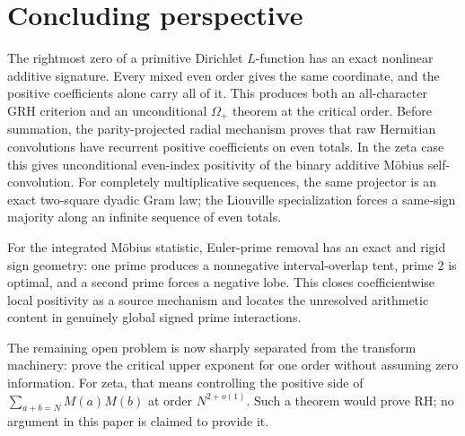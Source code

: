 \documentclass[11pt]{article}
\theoremstyle{remark}
\newcommand{\GRH}{\mathrm{GRH}}
\newcommand{\RH}{\mathrm{RH}}
\begin{document}
\section{Concluding perspective}

The rightmost zero of a primitive Dirichlet $L$-function has an exact nonlinear additive
signature.  Every mixed even order gives the same coordinate, and the positive coefficients
alone carry all of it.  This produces both an all-character $\GRH$ criterion and an unconditional
$\Omega_+$ theorem at the critical order.  Before summation, the parity-projected radial mechanism
proves that raw Hermitian convolutions have recurrent positive coefficients on even totals.  In
the zeta case this gives unconditional even-index positivity of the binary additive M\"obius
self-convolution.  For completely multiplicative sequences, the same projector is an exact
two-square dyadic Gram law; the Liouville specialization forces a same-sign majority along an
infinite sequence of even totals.

For the integrated M\"obius statistic, Euler-prime removal has an exact and rigid sign geometry:
one prime produces a nonnegative interval-overlap tent, prime $2$ is optimal, and a second prime
forces a negative lobe.  This closes coefficientwise local positivity as a source mechanism and
locates the unresolved arithmetic content in genuinely global signed prime interactions.

The remaining open problem is now sharply separated from the transform machinery: prove the
critical upper exponent for one order without assuming zero information.  For zeta, that means
controlling the positive side of $\sum_{a+b=N}M(a)M(b)$ at order $N^{2+o(1)}$.  Such a theorem
would prove $\RH$; no argument in this paper is claimed to provide it.
\end{document}
